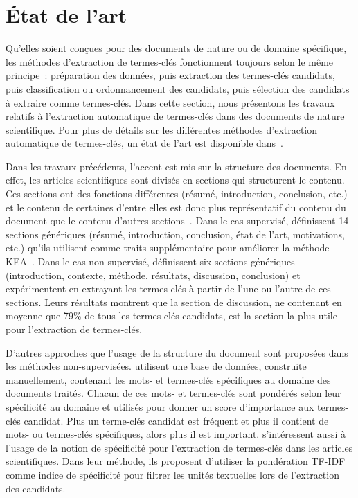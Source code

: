 \section{État de l'art}
\label{sec:etat_de_l_art}
  Qu'elles soient conçues pour des documents de nature ou de domaine spécifique,
  les méthodes d'extraction de termes-clés fonctionnent toujours selon le même
  principe~: préparation des données, puis extraction des termes-clés candidats,
  puis classification ou ordonnancement des candidats, puis sélection des
  candidats à extraire comme termes-clés. Dans cette section, nous présentons
  les travaux relatifs à l'extraction automatique de termes-clés dans des
  documents de nature scientifique. Pour plus de détails sur les différentes
  méthodes d'extraction automatique de termes-clés, un état de l'art est
  disponible dans~\cite{bougouin2013stateoftheart}.

  Dans les travaux précédents, l'accent est mis sur la structure des documents.
  En effet, les articles scientifiques sont divisés en sections qui structurent
  le contenu. Ces sections ont des fonctions différentes (résumé, introduction,
  conclusion, etc.) et le contenu de certaines d'entre elles est donc plus
  représentatif du contenu du document que le contenu d'autres
  sections~\cite{shah2003wherearethekeywords}. Dans le cas supervisé,
   définissent 14 sections génériques
  (résumé, introduction, conclusion, état de l'art, motivations, etc.) qu'ils
  utilisent comme traits supplémentaire pour améliorer la méthode
  KEA~\cite{witten1999kea}. Dans le cas non-supervisé,
   définissent six sections
  génériques (introduction, contexte, méthode, résultats, discussion,
  conclusion) et expérimentent en extrayant les termes-clés à partir de l'une ou
  l'autre de ces sections. Leurs résultats montrent que la section de
  discussion, ne contenant en moyenne que 79\% de tous les termes-clés
  candidats, est la section la plus utile pour l'extraction de termes-clés.

  D'autres approches que l'usage de la structure du document sont proposées dans
  les méthodes non-supervisées.
   utilisent une base de
  données, construite manuellement, contenant les mots- et termes-clés
  spécifiques au domaine des documents traités. Chacun de ces mots- et
  termes-clés sont pondérés selon leur spécificité au domaine et utilisés pour
  donner un score d'importance aux termes-clés candidat. Plus un terme-clés
  candidat est fréquent et plus il contient de mots- ou termes-clés spécifiques,
  alors plus il est important.  s'intéressent
  aussi à l'usage de la notion de spécificité pour l'extraction de termes-clés
  dans les articles scientifiques. Dans leur méthode, ils proposent d'utiliser
  la pondération TF-IDF~\cite{jones1972tfidf} comme indice de spécificité pour
  filtrer les unités textuelles lors de l'extraction des candidats.

